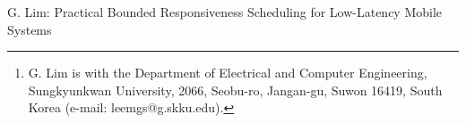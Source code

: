 

 \author{



\thanks{G. Lim is with the Department of Electrical and Computer Engineering, Sungkyunkwan University, 2066, Seobu-ro, Jangan-gu, Suwon 16419, South Korea (e-mail: leemgs@g.skku.edu). }  

}


%
{G. Lim: Practical Bounded Responsiveness Scheduling for Low-Latency Mobile Systems}




\maketitle

\thispagestyle{empty}%